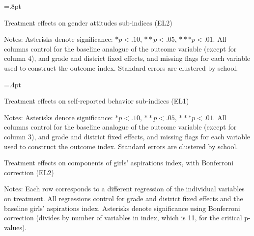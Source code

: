 \documentclass[letterpaper,12pt,pdftex]{article}
\begin{document}
\clearpage
\newpage

\begin{table}
\tabcolsep=.8pt
		\caption{Treatment effects on gender attitudes sub-indices (EL2)}
		\label{tab_att_si_el2}
		\begin{center}
			\small
			
		\end{center}
\flushleft \footnotesize {Notes: Asterisks denote significance: $* p < .10$, $** p < .05$, $*** p < .01$. All columns control for the baseline analogue of the outcome variable (except for column 4), and grade and district fixed effects, and missing flags for each variable used to construct the outcome index. Standard errors are clustered by school. }
\end{table}

\clearpage
\newpage

\begin{table}
\tabcolsep=.4pt
		\caption{Treatment effects on self-reported behavior sub-indices (EL1)}
		\label{tab_beh_si_el2}
		\begin{center}
			\small
			
		\end{center}
\flushleft \footnotesize {Notes: Asterisks denote significance: $* p < .10$, $** p < .05$, $*** p < .01$. All columns control for the baseline analogue of the outcome variable (except for column 3), and grade and district fixed effects, and missing flags for each variable used to construct the outcome index. Standard errors are clustered by school. }
\end{table}
\restoregeometry

\clearpage
\newpage

\begin{table}
\tabcolsep=8pt
		\caption{Treatment effects on components of girls' aspirations index, with Bonferroni correction (EL2)}
		\label{tab_aspatt_ivars_el2}
		\begin{center}
			\footnotesize{}
		\end{center}
\flushleft \footnotesize {Notes: Each row corresponds to a different regression of the individual variables on treatment. All regressions control for grade and district fixed effects and the baseline girls' aspirations index. Asterisks denote significance using Bonferroni correction (divides by number of variables in index, which is 11, for the critical p-values).}
\end{table}
\end{document}

